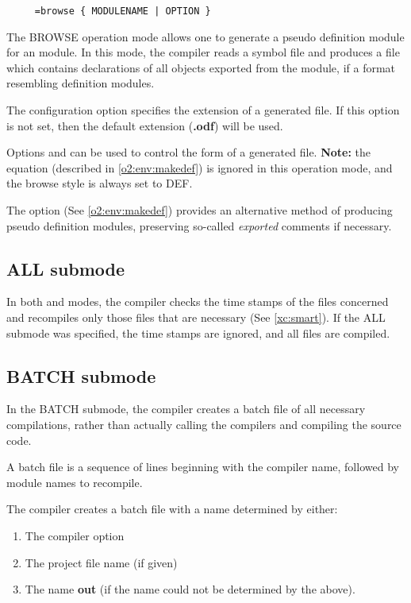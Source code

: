 \verb'    '\xc{}\verb' =browse { MODULENAME | OPTION }'

The BROWSE operation mode allows one to generate a pseudo definition
module for an \ot{} module. In this mode, the compiler reads a symbol
file and produces a file which contains
declarations of all objects exported from the \ot{} module,
if a format resembling \mt{} definition modules.

The configuration option 
specifies the extension of a generated file.
If this option is not set, then the default extension ({\bf .odf})
will be used. 

Options  and  can be used to control the
form of a generated file. {\bf Note:} the  equation
(described in \ref{o2:env:makedef}) is ignored in this operation mode,
and the browse style is always set to DEF.

The  option (See \ref{o2:env:makedef}) provides
an alternative method of producing pseudo definition modules,
preserving so-called {\em exported} comments if necessary.

\subsection{ALL submode}
\label{xc:modes:all}

In both  and  modes,
the compiler checks the time stamps of the files concerned and recompiles
only those files that are necessary (See \ref{xc:smart}).
If the ALL submode was specified, the time stamps are ignored,
and all files are compiled.

\subsection{BATCH submode}\label{xc:modes:batch}

In the BATCH submode, the compiler creates a batch file of all necessary
compilations, rather than actually calling the compilers and compiling
the source code.

A batch file is a sequence of lines beginning with the compiler name,
followed by module names to recompile.

The compiler creates a batch file with a name determined by either:
\begin{enumerate}
\item The compiler option 
\item The project file name (if given)
\item The name {\bf out} (if the name could not be determined
      by the above).
\end{enumerate}

